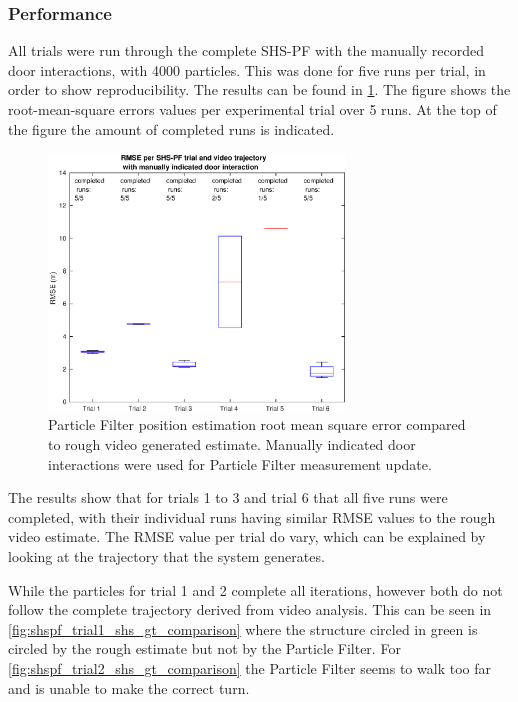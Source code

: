 \subsubsection{Performance}
All trials were run through the complete SHS-PF with the manually recorded door interactions, with 4000 particles. This was done for five runs per trial, in order to show reproducibility. The results can be found in \cref{fig:pf_boxplot}. The figure shows the root-mean-square errors values per experimental trial over 5 runs. At the top of the figure the amount of completed runs is indicated.

\begin{figure}[H]
	\centering
	\includegraphics[width=0.7\textwidth]{images/20201129_1419_RMSE_manually_indicated_ar_shspf_trials_1}
	\caption[Particle Filter position estimation performance with manual door interaction]{Particle Filter position estimation root mean square error compared to rough video generated estimate. Manually indicated door interactions were used for Particle Filter measurement update.}	
	\label{fig:pf_boxplot}
\end{figure}

The results show that for trials 1 to 3 and trial 6 that all five runs were completed, with their individual runs having similar RMSE values to the rough video estimate. The RMSE value per trial do vary, which can be explained by looking at the trajectory that the system generates. \par  

While the particles for trial 1 and 2 complete all iterations, however both do not follow the complete trajectory derived from video analysis. This can be seen in  \cref{fig:shspf_trial1_shs_gt_comparison} where the structure circled in green is circled by the rough estimate but not by the Particle Filter. For \cref{fig:shspf_trial2_shs_gt_comparison} the Particle Filter seems to walk too far and is unable to make the correct turn.

